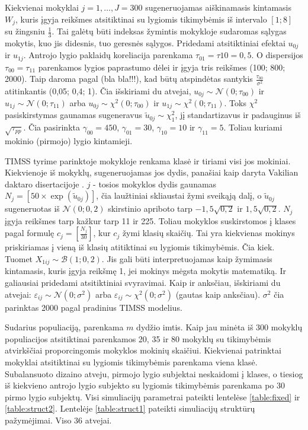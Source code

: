 \documentclass[12pt,a4paper]{article}
\begin{document}
\indent Kiekvienai mokyklai $j =1,\dots,J=300$ sugeneruojamas aiškinamasis kintamasis $W_j$, kuris įgyja reikšmes atsitiktinai su lygiomis tikimybėmis iš intervalo $[1; 8]$ su žingsniu $\frac{1}{3}$. Tai galėtų būti indeksas žymintis mokykloje sudaromas sąlygas mokytis, kuo jis didesnis, tuo geresnės sąlygos. Pridedami atsitiktiniai efektai $u_{0j}$ ir $u_{1j}$. Antrojo lygio paklaidų koreliacija parenkama $\tau_{01} = \tau{10}=0,5$. O dispersijos $\tau_{00}=\tau_{11}$ parenkamos lygios paprastumo dėlei ir įgyja tris reikšmes (100; 800; 2000). Taip daroma pagal (bla bla!!!), kad būtų atspindėtas santykis $\frac{\tau_{00}}{\sigma^2}$ atitinkantis (0,05; 0,4; 1). Čia išskiriami du atvejai, $u_{0j}\sim \mathcal{N}(0; \tau_{00})$ ir $u_{1j}\sim \mathcal{N}(0; \tau_{11})$ arba $u_{0j}\sim \chi^2(0; \tau_{00})$ ir $u_{1j}\sim \chi^2(0; \tau_{11})$. Toks $\chi^2$ pasiskirstymas gaunamas sugeneravus $\tilde{u}_{0j}\sim\chi^2_1$, jį standartizavus ir padauginus iš $\sqrt{\tau_{pp}}$. Čia pasirinkta  $\gamma_{00}=450$, $\gamma_{01}=30$, $\gamma_{10}=10$ ir $\gamma_{11}=5$. Toliau kuriami mokinio (pirmojo) lygio kintamieji.

\indent TIMSS tyrime parinktoje mokykloje renkama klasė ir tiriami visi jos mokiniai. Kiekvienoje iš mokyklų, sugeneruojamas jos dydis, panašiai kaip daryta Vakilian daktaro disertacijoje \cite{mcmc}. $j$ - tosios mokyklos dydis gaunamas $N_j=\left[50\times\exp{(\tilde{u}_{0j})}\right]$, čia laužtiniai skliaustai žymi sveikąją dalį, o $\tilde{u}_{0j}$ sugeneruotas iš $\mathcal{N}(0; 0,2)$ skirstinio apriboto tarp $-1,5\sqrt{0,2}$ ir $1,5\sqrt{0,2}$.  $N_j$ įgyja reikšmes tarp kažkur tarp 11 ir 225. Toliau mokyklos suskirstomos į klases pagal formulę $c_j=\left[\frac{N_j}{30}\right]$, kur $c_j$ žymi klasių skaičių. Tai yra kiekvienas mokinys priskiriamas į vieną iš klasių atitiktinai su lygiomis tikimybėmis. Čia kiek. Tuomet $X_{1ij}\sim \mathcal{B}(1; 0,2)$. Jis gali būti interpretuojamas kaip žymimasis kintamasis, kuris įgyja reikšmę 1, jei mokinys mėgsta mokytis matematiką. Ir galiausiai pridedami atsitiktiniai svyravimai. Kaip ir anksčiau, išskiriami du atvejai: $\varepsilon_{ij}\sim \mathcal{N}(0; \sigma^2)$ arba $\varepsilon_{ij}\sim \chi^2(0; \sigma^2)$ (gautas kaip anksčiau). $\sigma^2$ čia parinktas 2000 pagal pradinius TIMSS modelius.

\indent Sudarius populiaciją, parenkama $m$ dydžio imtis. Kaip jau minėta iš 300 mokyklų populiacijos atsitiktinai parenkamos 20, 35 ir 80 mokyklų su tikimybėmis atvirkščiai proporcingomis mokyklos mokinių skaičiui. Kiekvienai patrinktai mokyklai atsitiktinai su lygiomis tikimybėmis parenkama viena klasė. Subalansuoto dizaino atveju, pirmojo lygio subjektai neskaidomi į klases, o tiesiog iš kiekvieno antrojo lygio subjekto su lygiomis tikimybėmis parenkama po 30 pirmo lygio subjektų. Visi simuliacijų parametrai pateikti lentelėse \ref{table:fixed} ir \ref{table:struct2}. Lentelėje \ref{table:struct1} pateikti simuliacijų struktūrų pažymėjimai. Viso 36 atvejai.
\end{document}
